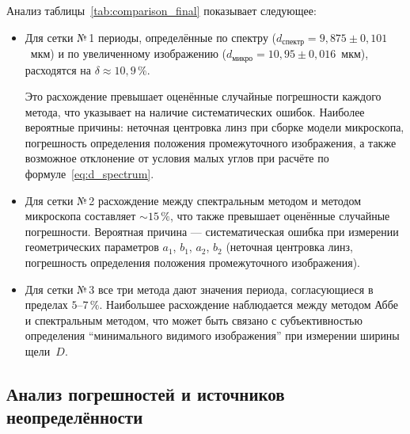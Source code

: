 \documentclass[a4paper]{article}
\begin{document}
Анализ таблицы~\ref{tab:comparison_final} показывает следующее:
\begin{itemize}
    \item Для сетки №\,1 периоды, определённые по спектру ($d_{\text{спектр}} = 9{,}875 \pm 0{,}101$~мкм) и по увеличенному изображению ($d_{\text{микро}} = 10{,}95 \pm 0{,}016$~мкм), расходятся на $\delta \approx 10{,}9\,\%$.

    Это расхождение превышает оценённые случайные погрешности каждого метода, что указывает на наличие систематических ошибок. Наиболее вероятные причины: неточная центровка линз при сборке модели микроскопа, погрешность определения положения промежуточного изображения, а также возможное отклонение от условия малых углов при расчёте по формуле~\eqref{eq:d_spectrum}.
    
    \item Для сетки №\,2 расхождение между спектральным методом и методом микроскопа составляет $\sim 15\,\%$, что также превышает оценённые случайные погрешности. Вероятная причина --- систематическая ошибка при измерении геометрических параметров $a_1$, $b_1$, $a_2$, $b_2$ (неточная центровка линз, погрешность определения положения промежуточного изображения).
    
    \item Для сетки №\,3 все три метода дают значения периода, согласующиеся в пределах $5$--$7\,\%$. Наибольшее расхождение наблюдается между методом Аббе и спектральным методом, что может быть связано с субъективностью определения ``минимального видимого изображения'' при измерении ширины щели~$D$.
\end{itemize}

\subsection{Анализ погрешностей и источников неопределённости}
\end{document}

